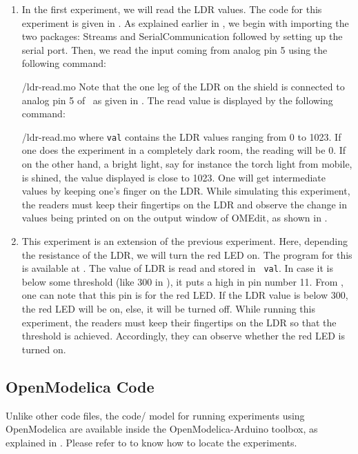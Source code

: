\begin{enumerate}
  \item In the first experiment, we will read the LDR values. The code for this experiment is given in
         . As explained earlier in , 
        we begin with importing the two packages: Streams and SerialCommunication followed 
        by setting up the serial port. Then, we read the input coming from analog pin 5 using the 
        following command:
        
        {\LocLDROpenModelicacode/ldr-read.mo} Note that the one leg of the LDR on
        the shield is connected to analog pin 5 of \arduino\, 
        as given in . The read value is displayed 
        by the following command: 
        
        {\LocLDROpenModelicacode/ldr-read.mo} where {\tt val} contains
        the LDR values ranging from 0 to 1023. If one does the experiment in a completely dark room, the
        reading will be 0. If on the other hand, a bright light, say for instance the torch
        light from mobile, is shined, the value displayed is close to 1023. One will get
        intermediate values by keeping one's finger on the LDR. While simulating this experiment, the readers must keep their fingertips on the LDR and
        observe the change in values being printed on on the output window of OMEdit, as shown in .
        
  \item This experiment is an extension of the previous experiment. Here, depending the resistance of the LDR, we will
        turn the red LED on.  The program for this is available at
        .  The value of LDR is read and stored in {\tt
            val}.  In case it is below some threshold (like 300 in ), 
        it puts a high in pin number 11. From , 
        one can note that this pin is for the red LED. If the LDR value is below 300, 
        the red LED will be on, else, it will be turned off. While running this experiment, the readers 
        must keep their fingertips on the LDR so that the threshold is achieved. Accordingly, 
        they can observe whether the red LED is turned on. 
\end{enumerate}

\subsection{OpenModelica Code}
Unlike other code files, the code/ model for running experiments using OpenModelica are 
available inside the OpenModelica-Arduino toolbox, as explained in .
Please refer to  to know how to locate the experiments. 

